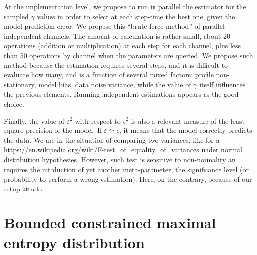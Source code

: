 \documentclass{article}
\begin{document}
At the implementation level, we propose to run in parallel the estimator for the sampled $\gamma$ values in order to select at each step-time the best one, given the model prediction error. We propose this ``brute force method'' of parallel independent channels. The amount of calculation is rather small, about 20 operations (addition or multiplication) at each step for each channel, plus less than 50 operations by channel when the parameters are queried. We propose such method because the estimation requires several steps, and it is difficult to evaluate how many, and is a function of several mixed factors: profile non-stationary, model bias, data noise variance, while the value of $\gamma$ itself influences the previous elements. Running independent estimations appears as the good choice.

Finally, the value of $\varepsilon^2$ with respect to $\epsilon^2$ is also a relevant measure of the least-square precision of the model. If $\varepsilon \simeq \epsilon$, it means that the model correctly predicts the data. We are in the situation of comparing two variances, like for a \href{F-test}{https://en.wikipedia.org/wiki/F-test\_of\_equality\_of\_variances} under normal distribution hypothesies. However, such test is sensitive to non-normality an requires the intrduction of yet another meta-parameter, the significance level (or probability to perform a wrong estimation). Here, on the contrary, because of our setup @todo

\iffalse

\clearpage \section{Bounded constrained maximal entropy distribution} \label{bcmed}
\end{document}
